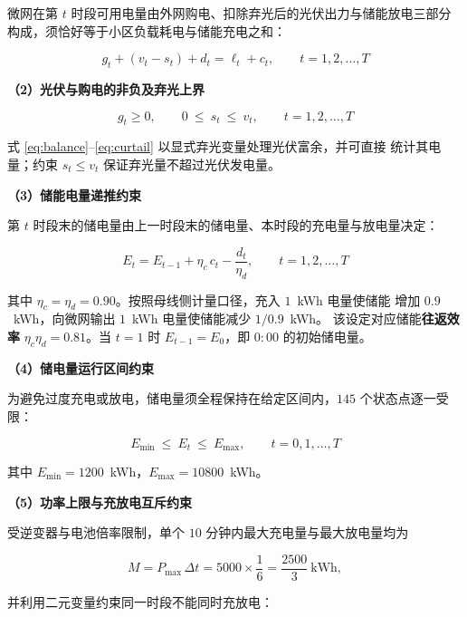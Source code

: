 \documentclass[withoutpreface,bwprint]{cumcmthesis}
\begin{document}
微网在第 $t$ 时段可用电量由外网购电、扣除弃光后的光伏出力与储能放电三部分
构成，须恰好等于小区负载耗电与储能充电之和：

\begin{equation}
  g_t + (v_t - s_t) + d_t = \ell_t + c_t, \qquad t = 1,2,\dots,T
  \label{eq:balance}
\end{equation}

\textbf{（2）光伏与购电的非负及弃光上界}

\begin{equation}
  g_t \ge 0, \qquad 0 \ \le\ s_t \ \le\ v_t, \qquad t = 1,2,\dots,T
  \label{eq:curtail}
\end{equation}

式 \eqref{eq:balance}--\eqref{eq:curtail} 以显式弃光变量处理光伏富余，并可直接
统计其电量；约束 $s_t\le v_t$ 保证弃光量不超过光伏发电量。

\textbf{（3）储能电量递推约束}

第 $t$ 时段末的储电量由上一时段末的储电量、本时段的充电量与放电量决定：

\begin{equation}
  E_t = E_{t-1} + \eta_c\, c_t - \frac{d_t}{\eta_d},
  \qquad t = 1,2,\dots,T
  \label{eq:recursion}
\end{equation}

其中 $\eta_c = \eta_d = 0.90$。按照母线侧计量口径，充入 $1$~kWh 电量使储能
增加 $0.9$~kWh，向微网输出 $1$~kWh 电量使储能减少 $1/0.9$~kWh。
该设定对应储能\textbf{往返效率} $\eta_c\eta_d = 0.81$。当 $t = 1$ 时
$E_{t-1} = E_0$，即 $0{:}00$ 的初始储电量。

\textbf{（4）储电量运行区间约束}

为避免过度充电或放电，储电量须全程保持在给定区间内，$145$ 个状态点逐一受限：

\begin{equation}
  E_{\min} \ \le\ E_t \ \le\ E_{\max}, \qquad t = 0,1,\dots,T
  \label{eq:socbound}
\end{equation}

其中 $E_{\min} = 1200$~kWh，$E_{\max} = 10800$~kWh。

\textbf{（5）功率上限与充放电互斥约束}

受逆变器与电池倍率限制，单个 $10$ 分钟内最大充电量与最大放电量均为

\begin{equation}
  M = P_{\max}\,\Delta t = 5000 \times \frac{1}{6} = \frac{2500}{3}\ \text{kWh},
  \label{eq:M}
\end{equation}

并利用二元变量约束同一时段不能同时充放电：
\end{document}
